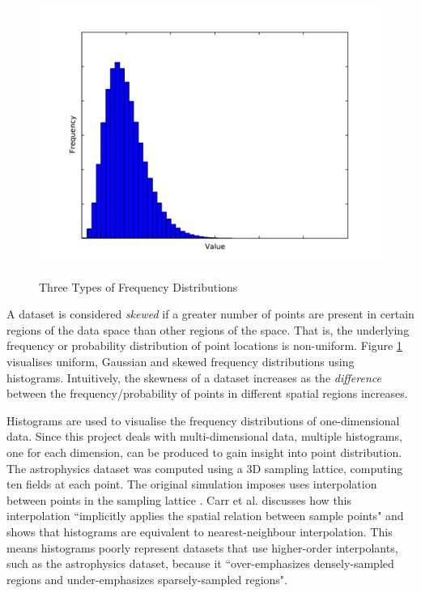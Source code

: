 \begin{figure}
\begin{center}
		\begin{subfloat} {%
			\includegraphics[scale=0.2]{figures/freqdist_gamma.pdf}
		}
		\end{subfloat}
	\end{center}

	\caption{Three Types of Frequency Distributions}
	\label{fig:frequency-distributions}
\end{figure}

A dataset is considered \textit{skewed} if a greater number of points are present in certain regions of the data space than other regions of the space. That is, the underlying frequency or probability distribution of point locations is non-uniform. Figure \ref{fig:frequency-distributions} visualises uniform, Gaussian and skewed frequency distributions using histograms. Intuitively, the skewness of a dataset increases as the \textit{difference} between the frequency/probability of points in different spatial regions increases.

Histograms are used to visualise the frequency distributions of one-dimensional data. Since this project deals with multi-dimensional data, multiple histograms, one for each dimension, can be produced to gain insight into point distribution. The astrophysics dataset was computed using a 3D sampling lattice, computing ten fields at each point. The original simulation imposes uses interpolation between points in the sampling lattice \cite{astrophysics-dataset}. Carr et al. discusses how this interpolation ``implicitly applies the spatial relation between sample points" and shows that histograms are equivalent to nearest-neighbour interpolation. This means histograms poorly represent datasets that use higher-order interpolants, such as the astrophysics dataset, because it ``over-emphasizes densely-sampled regions and under-emphasizes sparsely-sampled regions". 

